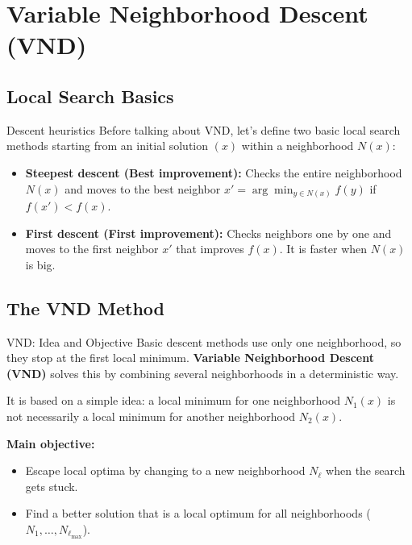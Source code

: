 \documentclass{beamer}
\begin{document}


\section{Variable Neighborhood Descent (VND)}

\subsection{Local Search Basics}
\begin{frame}{Descent heuristics}
\quad Before talking about VND, let's define two basic local search methods starting from an initial solution $(x)$ within a neighborhood $N(x)$:

\vspace{0.3cm}
\begin{itemize}
\item \textbf{Steepest descent (Best improvement):} Checks the entire neighborhood $N(x)$ and moves to the best neighbor $x' = \arg\min_{y \in N(x)} f(y)$ if $f(x') < f(x)$.
\vspace{0.2cm}
\item \textbf{First descent (First improvement):} Checks neighbors one by one and moves to the first neighbor $x'$ that improves $f(x)$. It is faster when $N(x)$ is big.
\end{itemize}
\end{frame}

\subsection{The VND Method}
\begin{frame}{VND: Idea and Objective}
\quad Basic descent methods use only one neighborhood, so they stop at the first local minimum. \textbf{Variable Neighborhood Descent (VND)} solves this by combining several neighborhoods in a deterministic way.

\vspace{0.2cm}
\quad It is based on a simple idea: a local minimum for one neighborhood $N_1(x)$ is not necessarily a local minimum for another neighborhood $N_2(x)$.

\vspace{0.3cm}
\textbf{Main objective:}
\begin{itemize}
\item Escape local optima by changing to a new neighborhood $N_\ell$ when the search gets stuck.
\item Find a better solution that is a local optimum for all neighborhoods ($N_1, \dots, N_{\ell_{\max}}$).
\end{itemize}
\end{frame}
\end{document}
